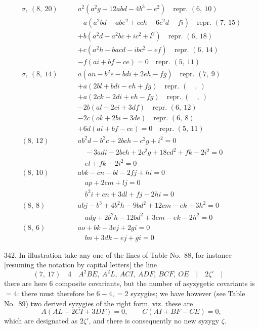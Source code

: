 \documentclass[11pt,a4paper]{article}
\begin{document}
\begin{align*}
\sigma,\ (8,\ 20)\qquad & a^{2}(a^{2}g - 12abd - 4b^{3} - e^{2}) \quad \text{repr.\ } (6,\ 10)\\
&- a(a^{2}bd - abe^{2} + cch - 6c^{2}d - fi) \quad \text{repr.\ } (7,\ 15)\\
&+ b(a^{2}d - a^{2}bc + ic^{2} + l^{2}) \quad \text{repr.\ } (6,\ 18)\\
&+ c(a^{2}h - bacd - ibc^{2} - ef) \quad \text{repr.\ } (6,\ 14)\\
&- f(ai + bf - ce) = 0 \quad \text{repr.\ } (5,\ 11)\\[1em]
\sigma,\ (8,\ 14)\qquad & a(an - b^{2}e - bdi + 2eh - fg) \quad \text{repr.\ } (7,\ 9)\\
&+ a(2bl + bdi - eh + fg) \quad \text{repr.\ } (\quad,\ )\\
&+ a(2ck - 2di + eh - fg) \quad \text{repr.\ } (\quad,\ )\\
&- 2b(al - 2ci + 3df) \quad \text{repr.\ } (6,\ 12)\\
&- 2c(ok + 2bi - 3de) \quad \text{repr.\ } (6,\ 8)\\
&+ 6d(ai + bf - ce) = 0 \quad \text{repr.\ } (5,\ 11)\\[1em]
(8,\ 12)\qquad & ab^{2}d - b^{2}c + 2bch - c^{2}g + i^{2} = 0\\
&\quad -3adi - 2bch + 2c^{2}g + 18cd^{2} + fk - 2i^{2} = 0\\
&\quad el + fk - 2i^{2} = 0\\[0.5em]
(8,\ 10)\qquad & abk - cn - bl - 2fj + hi = 0\\
&\quad ap + 2cm + lj = 0\\
&\quad b^{2}i + cn + 3dl + fj - 2hi = 0\\[0.5em]
(8,\ 8)\qquad & abj - b^{3} + 4b^{2}h - 9bd^{2} + 12cm - ek - 3h^{2} = 0\\
&\quad adg + 2b^{2}h - 12bd^{2} + 3cm - ek - 2h^{2} = 0\\[0.5em]
(8,\ 6)\qquad & ao + bk - 3ej + 2gi = 0\\
&\quad bn + 3dk - ej + gi = 0
\end{align*}

\newpage
\setcounter{page}{348}

342. In illustration take any one of the lines of Table No.~88, for instance [resuming the notation by capital letters] the line
\[
(7,\ 17)\quad 4\quad A^{2}BE,\ A^{2}L,\ ACI,\ ADF,\ BCF,\ OE \quad|\quad 2\zeta' \quad|\quad
\]
there are here 6 composite covariants, but the number of asyzygetic covariants is $=4$: there must therefore be $6 - 4, = 2$ syzygies; we have however (see Table No.~89) two derived syzygies of the right form, viz. these are
\[
A(AL - 2CI + 3DF) = 0,\qquad C(AI + BF - CE) = 0,
\]
which are designated as $2\zeta'$, and there is consequently no new syzygy $\zeta$.
\end{document}
